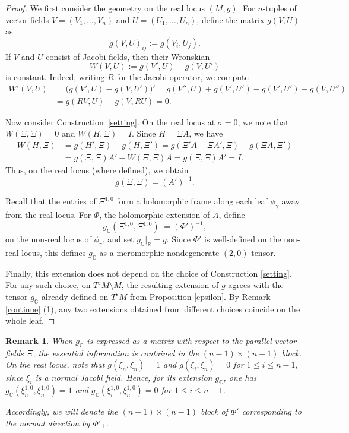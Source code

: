 \documentclass[a4paper, 12pt]{article}
\newcommand{\gC}{g_{\mathbb{C}}}
\newtheorem{rem}[thm]{Remark}
\begin{document}
\begin{proof}
We first consider the geometry on the real locus $(M,g)$. For $n$-tuples of vector fields $V=(V_1,\dots,V_n)$ and $U=(U_1,\dots,U_n)$, define the matrix $g(V,U)$ as
\[
g(V,U)_{ij} := g(V_i, U_j).
\]
If $V$ and $U$ consist of Jacobi fields, then their Wronskian
\[
W(V,U) := g(V',U) - g(V,U')
\]
is constant. Indeed, writing $R$ for the Jacobi operator, we compute
\[
\begin{aligned}
W'(V,U) &= \bigl(g(V',U) - g(V,U')\bigr)' = g(V'',U) + g(V',U') - g(V',U') - g(V,U'') \\
&= g(RV,U) - g(V,RU) = 0.
\end{aligned}
\]

Now consider Construction~\ref{setting}. On the real locus at $\sigma=0$, we note that $W(\Xi,\Xi)=0$ and $W(H,\Xi)=I$. Since $H = \Xi A$, we have
\[
\begin{aligned}
W(H,\Xi)
&= g(H',\Xi) - g(H,\Xi') = g(\Xi' A + \Xi A',\Xi) - g( \Xi A,\Xi') \\
&= g(\Xi,\Xi) A' - W(\Xi,\Xi)A = g(\Xi,\Xi) A' = I.
\end{aligned}
\]
Thus, on the real locus (where defined), we obtain
\[
g(\Xi,\Xi) = (A')^{-1}.
\]

Recall that the entries of $\Xi^{1,0}$ form a holomorphic frame along each leaf $\phi_\gamma$ away from the real locus. For $\Phi$, the holomorphic extension of $A$, define
\[
\gC(\Xi^{1,0}, \Xi^{1,0}) := (\Phi')^{-1},
\]
on the non-real locus of $\phi_\gamma$, and set $\gC|_{\mathbb{R}} = g$. Since $\Phi'$ is well-defined on the non-real locus, this defines $\gC$ as a meromorphic nondegenerate $(2,0)$-tensor.

Finally, this extension does not depend on the choice of Construction \ref{setting}. For any such choice, on $T^\varepsilon M\setminus M$, the resulting extension of $g$ agrees with the tensor $\gC$ already defined on $T^\varepsilon M$ from Proposition \ref{epsilon}.
By Remark \ref{continue} (1), any two extensions obtained from different choices coincide on the whole leaf.
\end{proof}

\begin{rem}\label{n-1}
When $\gC$ is expressed as a matrix with respect to the parallel vector fields $\Xi$, the essential information is contained in the $(n-1)\times(n-1)$ block. On the real locus, note that $g(\xi_n,\xi_n)=1$ and $g(\xi_i,\xi_n)=0$ for $1 \le i \le n-1$, since $\xi_i$ is a normal Jacobi field. Hence, for its extension $\gC$, one has $\gC(\xi_n^{1,0}, \xi_n^{1,0})=1$ and $\gC(\xi_i^{1,0}, \xi_n^{1,0})=0$ for $1 \le i \le n-1$. 

Accordingly, we will denote the $(n-1)\times(n-1)$ block of $\Phi'$ corresponding to the normal direction by $\Phi'_\perp$.
\end{rem}
\end{document}
